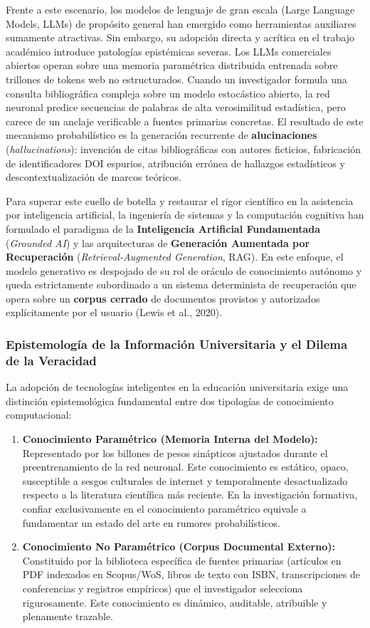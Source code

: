Frente a este escenario, los modelos de lenguaje de gran escala (Large Language Models, LLMs) de propósito general han emergido como herramientas auxiliares sumamente atractivas. Sin embargo, su adopción directa y acrítica en el trabajo académico introduce patologías epistémicas severas. Los LLMs comerciales abiertos operan sobre una memoria paramétrica distribuida entrenada sobre trillones de tokens web no estructurados. Cuando un investigador formula una consulta bibliográfica compleja sobre un modelo estocástico abierto, la red neuronal predice secuencias de palabras de alta verosimilitud estadística, pero carece de un anclaje verificable a fuentes primarias concretas. El resultado de este mecanismo probabilístico es la generación recurrente de \textbf{alucinaciones} (\textit{hallucinations}): invención de citas bibliográficas con autores ficticios, fabricación de identificadores DOI espurios, atribución errónea de hallazgos estadísticos y descontextualización de marcos teóricos.

Para superar este cuello de botella y restaurar el rigor científico en la asistencia por inteligencia artificial, la ingeniería de sistemas y la computación cognitiva han formulado el paradigma de la \textbf{Inteligencia Artificial Fundamentada} (\textit{Grounded AI}) y las arquitecturas de \textbf{Generación Aumentada por Recuperación} (\textit{Retrieval-Augmented Generation}, RAG). En este enfoque, el modelo generativo es despojado de su rol de oráculo de conocimiento autónomo y queda estrictamente subordinado a un sistema determinista de recuperación que opera sobre un \textbf{corpus cerrado} de documentos provistos y autorizados explícitamente por el usuario (Lewis et al., 2020).

\subsubsection{Epistemología de la Información Universitaria y el Dilema de la Veracidad}

La adopción de tecnologías inteligentes en la educación universitaria exige una distinción epistemológica fundamental entre dos tipologías de conocimiento computacional:

\begin{enumerate}
    \item \textbf{Conocimiento Paramétrico (Memoria Interna del Modelo):} Representado por los billones de pesos sinápticos ajustados durante el preentrenamiento de la red neuronal. Este conocimiento es estático, opaco, susceptible a sesgos culturales de internet y temporalmente desactualizado respecto a la literatura científica más reciente. En la investigación formativa, confiar exclusivamente en el conocimiento paramétrico equivale a fundamentar un estado del arte en rumores probabilísticos.
    \item \textbf{Conocimiento No Paramétrico (Corpus Documental Externo):} Constituido por la biblioteca específica de fuentes primarias (artículos en PDF indexados en Scopus/WoS, libros de texto con ISBN, transcripciones de conferencias y registros empíricos) que el investigador selecciona rigurosamente. Este conocimiento es dinámico, auditable, atribuible y plenamente trazable.
\end{enumerate}

